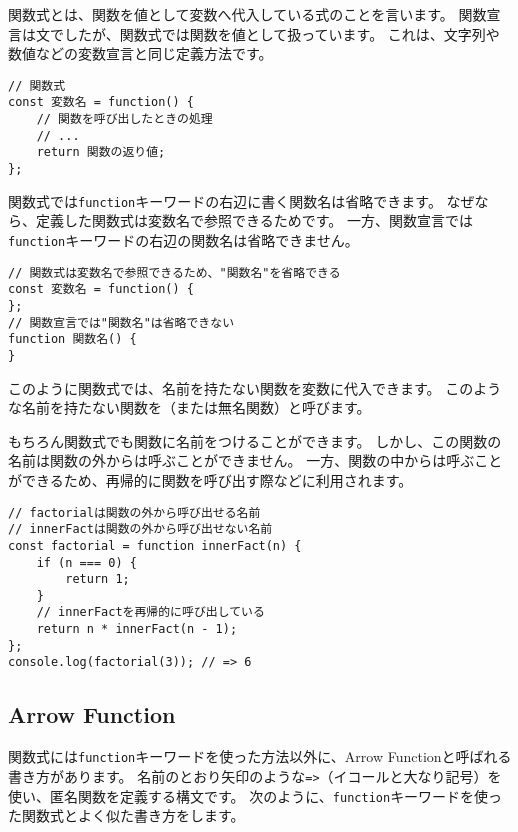 関数式とは、関数を値として変数へ代入している式のことを言います。
関数宣言は文でしたが、関数式では関数を値として扱っています。
これは、文字列や数値などの変数宣言と同じ定義方法です。

\begin{lstlisting}
// 関数式
const 変数名 = function() {
    // 関数を呼び出したときの処理
    // ...
    return 関数の返り値;
};
\end{lstlisting}

関数式では\texttt{function}キーワードの右辺に書く関数名は省略できます。
なぜなら、定義した関数式は変数名で参照できるためです。
一方、関数宣言では\texttt{function}キーワードの右辺の関数名は省略できません。

\begin{lstlisting}
// 関数式は変数名で参照できるため、"関数名"を省略できる
const 変数名 = function() {
};
// 関数宣言では"関数名"は省略できない
function 関数名() {
}
\end{lstlisting}

このように関数式では、名前を持たない関数を変数に代入できます。
このような名前を持たない関数を\textbf{}（または無名関数）と呼びます。

もちろん関数式でも関数に名前をつけることができます。
しかし、この関数の名前は関数の外からは呼ぶことができません。
一方、関数の中からは呼ぶことができるため、再帰的に関数を呼び出す際などに利用されます。

\begin{lstlisting}
// factorialは関数の外から呼び出せる名前
// innerFactは関数の外から呼び出せない名前
const factorial = function innerFact(n) {
    if (n === 0) {
        return 1;
    }
    // innerFactを再帰的に呼び出している
    return n * innerFact(n - 1);
};
console.log(factorial(3)); // => 6
\end{lstlisting}

\hypertarget{arrow-function}{%
\subsection[Arrow Function]{Arrow Function\,\protect{}}\label{arrow-function}}

関数式には\texttt{function}キーワードを使った方法以外に、Arrow
Functionと呼ばれる書き方があります。
名前のとおり矢印のような\texttt{=>}（イコールと大なり記号）を使い、匿名関数を定義する構文です。
次のように、\texttt{function}キーワードを使った関数式とよく似た書き方をします。

